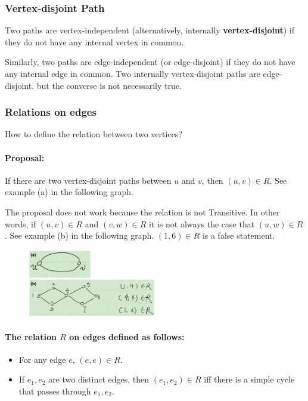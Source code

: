 \documentclass[en,hazy,blue,screen,14pt]{elegantnote}
\begin{document}
\subsubsection{Vertex-disjoint Path}
Two paths are vertex-independent (alternatively, internally 
\textbf{vertex-disjoint}) if they do not have any internal vertex in common. 

Similarly, two paths are edge-independent (or edge-disjoint) if they do not 
have any internal edge in common. Two internally vertex-disjoint paths 
are edge-disjoint, but the converse is not necessarily true.

\subsubsection{Relations on edges}
How to define the relation between two vertices?

\paragraph{Proposal:} If there are two vertex-disjoint paths between $u$ and 
$v$, then $(u, v) \in R$. See example (a) in the following graph.

The proposal does not work because the relation is not Transitive. In other 
words, if $(u, v) \in R$ and $(v, w) \in R$ it is not always the case that 
$(u, w) \in R$.
See example (b) in the following graph. $(1, 6) \in R$ is a false statement.

\begin{figure}[H]
\centering
\includegraphics[width=0.5\textwidth]{relation.png}
\end{figure}

\paragraph{The relation $R$ on edges defined as follows:}
\begin{itemize}
\item For any edge $e$, $(e,e) \in R$.
\item If $e_1, e_2$ are two distinct edges, then $(e_1, e_2) \in R$ iff there 
is a simple cycle that passes through $e_1, e_2$.
\end{itemize}
\end{document}
